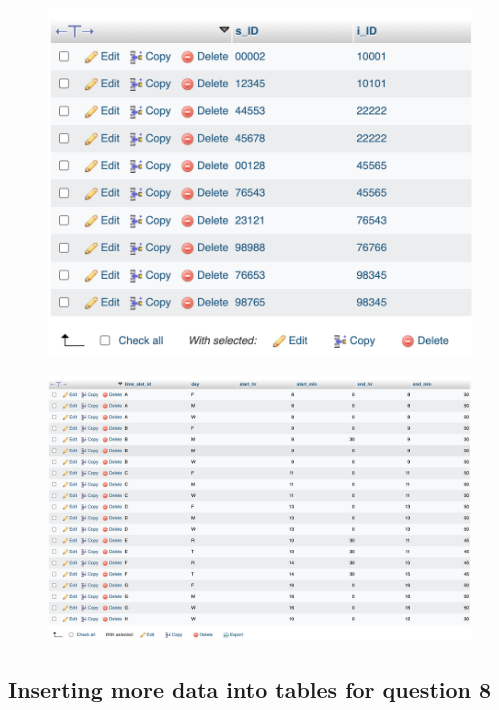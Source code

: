 \documentclass[12pt]{article}
\begin{document}
\newpage

\begin{figure}[!hbt]
    \centering
    \includegraphics[scale=0.65]{screenshots/7 3 advisor.png}
    \label{fig:my_label1}
\end{figure}

\begin{figure}[!hbt]
    \centering
    \includegraphics[scale=0.43]{screenshots/7 3 time_slot.png}
    \label{fig:my_label1}
\end{figure}

\newpage

\subsection{Inserting more data into tables for question 8}
\end{document}
